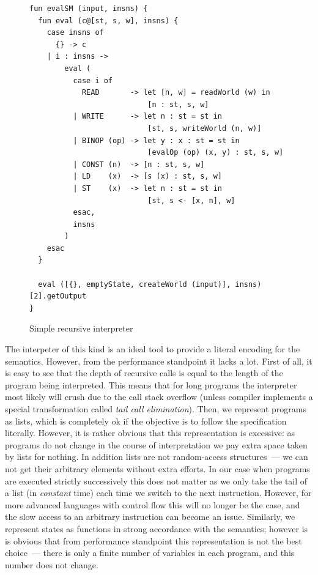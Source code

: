 \begin{figure}
  \begin{lstlisting}
fun evalSM (input, insns) {
  fun eval (c@[st, s, w], insns) {
    case insns of
      {} -> c
    | i : insns ->
        eval (
          case i of
            READ       -> let [n, w] = readWorld (w) in
                           [n : st, s, w]
          | WRITE      -> let n : st = st in
                           [st, s, writeWorld (n, w)]    
          | BINOP (op) -> let y : x : st = st in
                           [evalOp (op) (x, y) : st, s, w] 
          | CONST (n)  -> [n : st, s, w]
          | LD    (x)  -> [s (x) : st, s, w]
          | ST    (x)  -> let n : st = st in
                           [st, s <- [x, n], w] 
          esac,
          insns
        )
    esac
  }
     
  eval ([{}, emptyState, createWorld (input)], insns)[2].getOutput
}
  \end{lstlisting}
  \caption{Simple recursive interpreter}
  \label{simple-recursive}
\end{figure}

The interpeter of this kind is an ideal tool to provide a literal encoding for the semantics. However, from the performance standpoint
it lacks a lot. First of all, it is easy to see that the depth of recursive calls is equal to the length of the program being interpreted.
This means that for long programs the interpreter most likely will crush due to the call stack overflow (unless \lama compiler implements a special
transformation called \emph{tail call elimination}). Then, we represent programs as lists, which is completely ok if the objective is
to follow the specification literally. However, it is rather obvious that this representation is excessive: as programs do
not change in the course of interpretation we pay extra space taken by lists for nothing. In addition lists are not random-access
structures~--- we can not get their arbitrary elements without extra efforts. In our case when programs are executed strictly
successively this does not matter as we only take the tail of a list (in \emph{constant} time) each time we switch to the next
instruction. However, for more advanced languages with control flow this will no longer be the case, and the slow access to an
arbitrary instruction can become an issue. Similarly, we represent states as functions in strong accordance with the semantics; however
is is obvious that from performance standpoint this representation is not the best choice~--- there is only a finite number of
variables in each program, and this number does not change.

